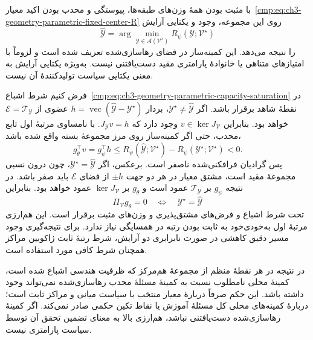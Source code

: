 با مثبت بودن همهٔ وزن‌های طبقه‌ها، پیوستگی و محدب بودن اکید معیار~\eqref{cmp:eq:ch3-geometry-parametric-fixed-center-R} روی این مجموعه، وجود و یکتایی آرایش
\begin{equation}\label{cmp:eq:ch3-geometry-parametric-relaxed-R-optimum}
\widehat{\mathscr Y}
=\arg\min_{\mathscr Y\in\mathcal A(\mathcal V^\star)}
R_\psi(\mathscr Y;\mathcal V^\star)
\end{equation}
را نتیجه می‌دهد. این کمینه‌ساز در فضای رهاسازی‌شده تعریف شده است و لزوماً با امتیازهای متناهی یا خانوادهٔ پارامتری مقید دست‌یافتنی نیست. به‌ویژه یکتایی آرایش به معنی یکتایی سیاست تولیدکنندهٔ آن نیست.

فرض کنیم شرط اشباع~\eqref{cmp:eq:ch3-geometry-parametric-capacity-saturation} در نقطهٔ شاهد برقرار باشد. اگر $\mathscr Y^\star\ne\widehat{\mathscr Y}$، بردار $h=\operatorname{vec}(\widehat{\mathscr Y}-\mathscr Y^\star)$ عضوی از $\mathcal E=\mathcal T_{\mathscr Y}$ خواهد بود. بنابراین $v\in\ker J_{\mathcal V}$ وجود دارد که $J_{\mathscr Y}v=h$. با نامساوی مرتبهٔ اول تابع محدب، حتی اگر کمینه‌ساز روی مرز مجموعهٔ بسته واقع شده باشد،
\begin{equation}\label{cmp:eq:ch3-geometry-parametric-saturated-descent}
g_\theta^\top v=g_\psi^\top h
\le R_\psi(\widehat{\mathscr Y};\mathcal V^\star)
-R_\psi(\mathscr Y^\star;\mathcal V^\star)<0.
\end{equation}
پس گرادیان فرافکنی‌شده ناصفر است. برعکس، اگر $\mathscr Y^\star=\widehat{\mathscr Y}$، چون درون نسبی مجموعهٔ مقید است، مشتق معیار در هر دو جهت $\pm h$ از فضای $\mathcal E$ باید صفر باشد. در نتیجه $g_\psi$ بر $\mathcal T_{\mathscr Y}$ عمود است و $g_\theta$ بر $\ker J_{\mathcal V}$ عمود خواهد بود. بنابراین
\begin{equation}\label{cmp:eq:ch3-geometry-parametric-saturated-stationarity}
\boxed{\Pi_{\mathcal V}g_\theta=0
\quad\Longleftrightarrow\quad
\mathscr Y^\star=\widehat{\mathscr Y}}
\end{equation}
تحت شرط اشباع و فرض‌های مشتق‌پذیری و وزن‌های مثبت برقرار است. این هم‌ارزی مرتبهٔ اول به‌خودی‌خود به ثابت بودن رتبه در همسایگی نیاز ندارد. برای نتیجه‌گیری وجود مسیر دقیق کاهشی در صورت نابرابری دو آرایش، شرط رتبهٔ ثابت ژاکوبین مراکز همچنان شرط کافی مورد استفاده است.

در نتیجه در هر نقطهٔ منظم از مجموعهٔ هم‌مرکز که ظرفیت هندسی اشباع شده است، کمینهٔ محلی نامطلوب نسبت به کمینهٔ مسئلهٔ محدب رهاسازی‌شده نمی‌تواند وجود داشته باشد. این حکم صرفاً دربارهٔ معیار منتخب با سیاست میانی و مراکز ثابت است؛ دربارهٔ کمینه‌های محلی کل مسئلهٔ آموزش یا نقاط تکین حکمی صادر نمی‌کند. اگر کمینهٔ رهاسازی‌شده دست‌یافتنی نباشد، هم‌ارزی بالا به معنای تضمین تحقق آن توسط سیاست پارامتری نیست.

